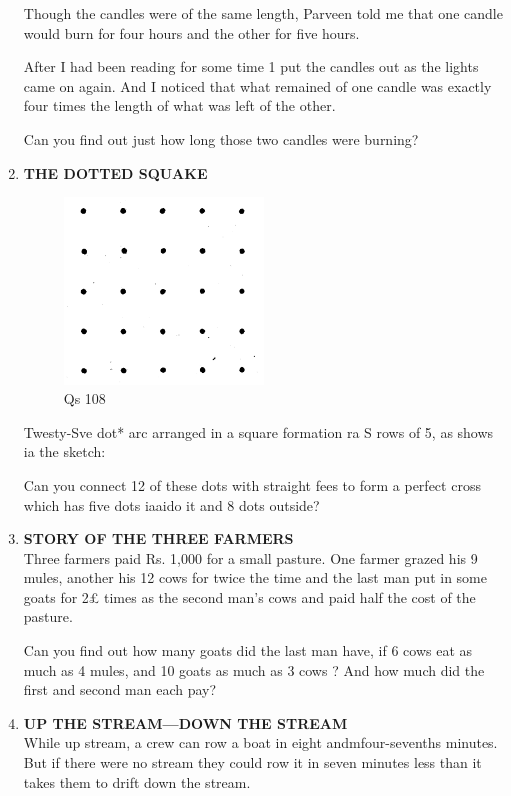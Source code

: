 \documentclass[12pt]{article}
\begin{document}
\begin{enumerate}
Though  the candles  were  of the same  length,  Parveen told me that  one candle  would  burn  for  four  hours  and the other  for five hours. 

After  I had been  reading  for some  time  1 put the candles  out as the lights  came  on again.  And  I noticed that what  remained  of one candle  was  exactly  four  times the length  of what  was  left of the other. 

Can you find  out just  how  long  those  two  candles were  burning? 
%
\item \textbf{THE  DOTTED  SQUAKE} \\

\begin{figure}[h]
\begin{center}
\includegraphics[width=0.5\textwidth]{sdevi_q108.png}
\caption{ Qs 108}
\end{center}
\end{figure}

Twesty-Sve  dot*  arc arranged  in a square  formation 
ra S rows  of 5, as shows  ia the sketch: 

Can you  connect  12 of these  dots  with  straight  fees to form  a perfect  cross  which  has five dots  iaaido  it and 8 dots outside? 
%
\item \textbf{STORY  OF  THE  THREE  FARMERS} \\ 
Three  farmers  paid  Rs.  1,000  for  a small  pasture. One farmer  grazed  his 9 mules,  another  his 12 cows  for twice  the time  and the last  man  put  in some  goats  for 2£ times  as the second  man's  cows  and paid  half  the  cost of the pasture. 

Can you find  out how  many  goats  did  the  last  man have,  if 6 cows  eat as much  as 4 mules,  and  10 goats  as much  as 3 cows  ? And  how  much  did the first  and  second man each  pay? 
%
\item \textbf{UP  THE  STREAM—DOWN  THE  STREAM} \\
While up stream, a crew can row a boat in eight andmfour-sevenths minutes. But if there were no stream they could row it in seven minutes less than it takes them to drift down the stream.


\end{enumerate}
\end{document}
